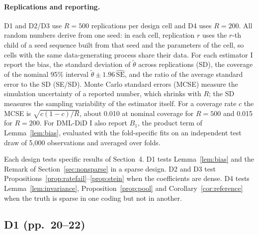 \documentclass[11pt]{article}
\newenvironment{ins}{\begin{leftbar}}{\end{leftbar}}
\theoremstyle{plain}
\theoremstyle{remark}
\begin{document}
\begin{ins}
\paragraph{Replications and reporting.} D1 and D2/D3 use $R=500$ replications per
design cell and D4 uses $R=200$. All random numbers derive from one seed: in
each cell, replication $r$ uses the $r$-th child of a seed sequence built from
that seed and the parameters of the cell, so cells with the same data-generating
process share their data. For each estimator I report the bias, the standard
deviation of $\tilde\theta$ across replications (SD), the coverage of the nominal
95\% interval $\tilde\theta\pm1.96\,\widehat{\mathrm{SE}}$, and the ratio of the
average standard error to the SD (SE/SD). Monte Carlo standard errors (MCSE)
measure the simulation uncertainty of a reported number, which shrinks with $R$;
the SD measures the sampling variability of the estimator itself. For a coverage
rate $c$ the MCSE is $\sqrt{c(1-c)/R}$, about 0.010 at nominal coverage for
$R=500$ and 0.015 for $R=200$. For DML-DiD I also report $B_1$, the product term
of Lemma~\ref{lem:bias}, evaluated with the fold-specific fits on an independent
test draw of 5{,}000 observations and averaged over folds.

Each design tests specific results of Section~4. D1 tests Lemma~\ref{lem:bias}
and the Remark of Section~\ref{sec:nonsparse} in a sparse design. D2 and D3 test
Propositions~\ref{prop:ratefail}--\ref{prop:stein} when the coefficients are
dense. D4 tests Lemma~\ref{lem:invariance}, Proposition~\ref{prop:pool} and
Corollary~\ref{cor:reference} when the truth is sparse in one coding but not in
another.
\end{ins}

\subsection{D1 (pp.~20--22)}
\end{document}
